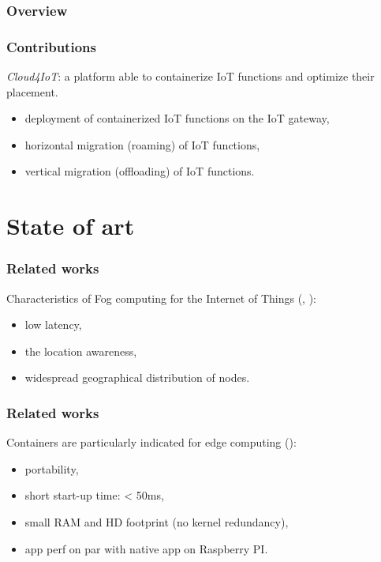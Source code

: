 \documentclass{beamer}
\begin{document}
\begin{frame}
\frametitle{Overview}
 
\end{frame}

\begin{frame}
\frametitle{Contributions}
 
  \emph{Cloud4IoT}: a platform able to containerize IoT functions and optimize their placement.
  \begin{itemize}
    \item deployment of containerized IoT functions on the IoT gateway,
    \item horizontal migration (roaming) of IoT functions,
    \item vertical migration (offloading) of IoT functions.
  \end{itemize}

\end{frame}

\section{State of art}

\begin{frame}
\frametitle{Related works}

 
Characteristics of Fog computing for the Internet of Things (\cite{Bonomi}, \cite{Mulfari2016}):
  \begin{itemize}
    \item low latency,
    \item the location awareness,
    \item widespread geographical distribution of nodes.
  \end{itemize}

\end{frame}

\begin{frame}
\frametitle{Related works}

Containers are particularly indicated for edge computing (\cite{morabito2017, ismail2015}):
  \begin{itemize}
    \item portability,
    \item short start-up time: < 50ms,
    \item small RAM and HD footprint (no kernel redundancy),
    \item app perf on par with native app on Raspberry PI.
  \end{itemize}

\end{frame}
\end{document}

